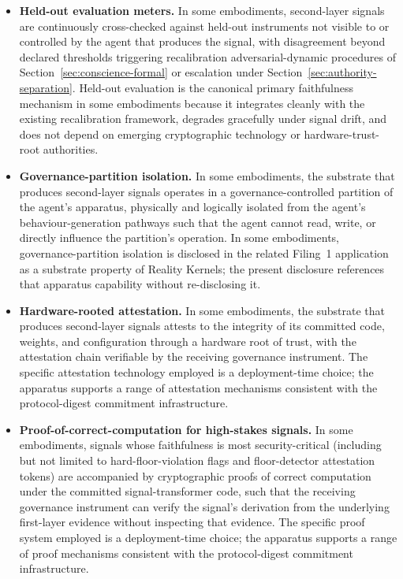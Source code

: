 \documentclass[a4paper,12pt]{article}
\newcommand{\RKs}{Reality Kernels\xspace}
\begin{document}
\begin{itemize}
  \item \textbf{Held-out evaluation meters.} In some embodiments,
    second-layer signals are continuously cross-checked against
    held-out instruments not visible to or controlled by the agent
    that produces the signal, with disagreement beyond declared
    thresholds triggering recalibration adversarial-dynamic
    procedures of Section~\ref{sec:conscience-formal} or escalation
    under Section~\ref{sec:authority-separation}. Held-out evaluation
    is the canonical primary faithfulness mechanism in some
    embodiments because it integrates cleanly with the existing
    recalibration framework, degrades gracefully under signal drift,
    and does not depend on emerging cryptographic technology or
    hardware-trust-root authorities.
  \item \textbf{Governance-partition isolation.} In some embodiments,
    the substrate that produces second-layer signals operates in a
    governance-controlled partition of the agent's apparatus,
    physically and logically isolated from the agent's
    behaviour-generation pathways such that the agent cannot read,
    write, or directly influence the partition's operation. In some
    embodiments, governance-partition isolation is disclosed in the
    related Filing~1 application as a substrate property of \RKs; the present disclosure references that apparatus
    capability without re-disclosing it.
  \item \textbf{Hardware-rooted attestation.} In some embodiments,
    the substrate that produces second-layer signals attests to the
    integrity of its committed code, weights, and configuration
    through a hardware root of trust, with the attestation chain
    verifiable by the receiving governance instrument. The specific
    attestation technology employed is a deployment-time choice;
    the apparatus supports a range of attestation mechanisms
    consistent with the protocol-digest commitment infrastructure.
  \item \textbf{Proof-of-correct-computation for high-stakes
    signals.} In some embodiments, signals whose faithfulness is
    most security-critical (including but not limited to
    hard-floor-violation flags and floor-detector attestation
    tokens) are accompanied by cryptographic proofs of correct
    computation under the committed signal-transformer code, such
    that the receiving governance instrument can verify the signal's
    derivation from the underlying first-layer evidence without
    inspecting that evidence. The specific proof system employed is
    a deployment-time choice; the apparatus supports a range of
    proof mechanisms consistent with the protocol-digest commitment
    infrastructure.
\end{itemize}
\end{document}

